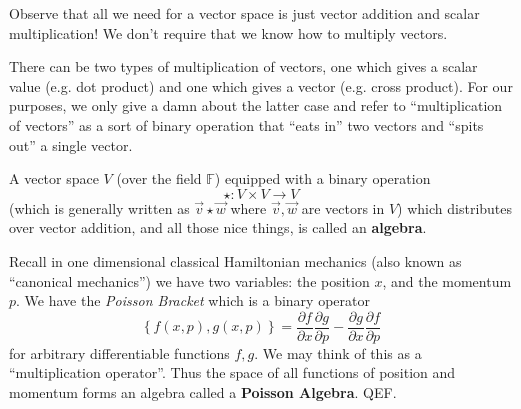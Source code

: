 Observe that all we need for a vector space is just vector addition and scalar
multiplication! We don't require that we know how to multiply vectors.

\begin{rmk}
There can be two types of multiplication of vectors, one which gives a scalar
value (e.g. dot product) and one which gives a vector (e.g. cross product). For
our purposes, we only give a damn about the latter case and refer to 
``multiplication of vectors'' as a sort of binary operation that ``eats in'' two
vectors and ``spits out'' a single vector.
\end{rmk}

\begin{defn}
A vector space $V$ (over the field $\mathbb{F}$) equipped with a binary operation
\begin{equation}
\star: V\times V\to V
\end{equation}
(which is generally written as $\vec{v}\star\vec{w}$ where $\vec{v},\vec{w}$ are
vectors in $V$) which distributes over vector addition, and all those nice 
things, is called an \textbf{algebra}.
\end{defn}

\begin{ex}
Recall in one dimensional classical Hamiltonian mechanics (also known as ``canonical mechanics'') we have two variables: the position $x$, and the momentum $p$. We have the \emph{Poisson Bracket} which is a binary operator
\begin{equation}
\left\{ f(x,p), g(x,p) \right\} = \frac{\partial f}{\partial x}\frac{\partial g}{\partial p} - \frac{\partial g}{\partial x}\frac{\partial f}{\partial p}
\end{equation}
for arbitrary differentiable functions $f,g$. We may think of this as a ``multiplication operator''. Thus the space of all functions of position and momentum forms an algebra called a \textbf{Poisson Algebra}. QEF.
\end{ex}

